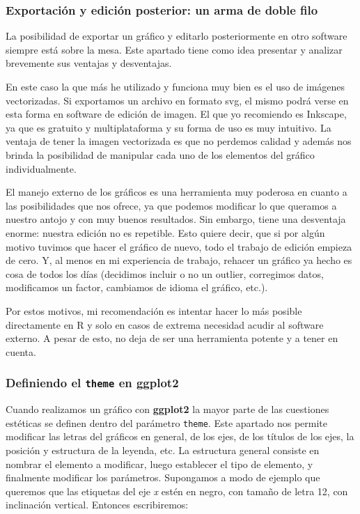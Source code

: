 \documentclass[
]{article}
\begin{document}
\subsubsection{Exportación y edición posterior: un arma de doble
filo}\label{exportaciuxf3n-y-ediciuxf3n-posterior-un-arma-de-doble-filo}

La posibilidad de exportar un gráfico y editarlo posteriormente en otro
software siempre está sobre la mesa. Este apartado tiene como idea
presentar y analizar brevemente sus ventajas y desventajas.

En este caso la que más he utilizado y funciona muy bien es el uso de
imágenes vectorizadas. Si exportamos un archivo en formato svg, el mismo
podrá verse en esta forma en software de edición de imagen. El que yo
recomiendo es Inkscape, ya que es gratuito y multiplataforma y su forma
de uso es muy intuitivo. La ventaja de tener la imagen vectorizada es
que no perdemos calidad y además nos brinda la posibilidad de manipular
cada uno de los elementos del gráfico individualmente.

El manejo externo de los gráficos es una herramienta muy poderosa en
cuanto a las posibilidades que nos ofrece, ya que podemos modificar lo
que queramos a nuestro antojo y con muy buenos resultados. Sin embargo,
tiene una desventaja enorme: nuestra edición no es repetible. Esto
quiere decir, que si por algún motivo tuvimos que hacer el gráfico de
nuevo, todo el trabajo de edición empieza de cero. Y, al menos en mi
experiencia de trabajo, rehacer un gráfico ya hecho es cosa de todos los
días (decidimos incluir o no un outlier, corregimos datos, modificamos
un factor, cambiamos de idioma el gráfico, etc.).

Por estos motivos, mi recomendación es intentar hacer lo más posible
directamente en R y solo en casos de extrema necesidad acudir al
software externo. A pesar de esto, no deja de ser una herramienta
potente y a tener en cuenta.

\subsubsection{\texorpdfstring{Definiendo el \texttt{theme} en
ggplot2}{Definiendo el theme en ggplot2}}\label{definiendo-el-theme-en-ggplot2}

Cuando realizamos un gráfico con \textbf{ggplot2} la mayor parte de las
cuestiones estéticas se definen dentro del parámetro \texttt{theme}.
Este apartado nos permite modificar las letras del gráficos en general,
de los ejes, de los títulos de los ejes, la posición y estructura de la
leyenda, etc. La estructura general consiste en nombrar el elemento a
modificar, luego establecer el tipo de elemento, y finalmente modificar
los parámetros. Supongamos a modo de ejemplo que queremos que las
etiquetas del eje \emph{x} estén en negro, con tamaño de letra 12, con
inclinación vertical. Entonces escribiremos:
\end{document}
